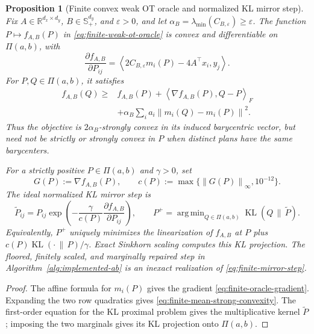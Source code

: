 \documentclass[11pt]{article}
\newcommand{\R}{\mathbb R}
\newcommand{\ip}[2]{\left\langle #1,#2\right\rangle}
\newcommand{\norm}[1]{\left\lVert #1\right\rVert}
\DeclareMathOperator{\KL}{KL}
\DeclareMathOperator*{\argmin}{arg\,min}
\theoremstyle{plain}
\newtheorem{proposition}[theorem]{Proposition}
\theoremstyle{definition}
\theoremstyle{remark}
\begin{document}
\begin{proposition}[Finite convex weak OT oracle and normalized KL mirror step]
\label{prop:finite-inner-mirror}
Fix \(A\in\R^{d_x\times d_y}\), \(B\in\mathbb S_+^{d_y}\), and
\(\varepsilon>0\), and let
\(\alpha_B=\lambda_{\min}(C_{B,\varepsilon})\ge\varepsilon\). The function
\(P\mapsto f_{A,B}(P)\) in \eqref{eq:finite-weak-ot-oracle} is convex and
differentiable on \(\Pi(a,b)\), with
\begin{equation}\label{eq:finite-oracle-gradient}
  \frac{\partial f_{A,B}}{\partial P_{ij}}
  =\ip{2C_{B,\varepsilon}m_i(P)-4A^\top x_i}{y_j}.
\end{equation}
For \(P,Q\in\Pi(a,b)\), it satisfies
\begin{equation}\label{eq:finite-mean-strong-convexity}
\begin{aligned}
 f_{A,B}(Q)\ge{}&f_{A,B}(P)
 +\ip{\nabla f_{A,B}(P)}{Q-P}_F\\
 &+\alpha_B\sum_i a_i\norm{m_i(Q)-m_i(P)}^2.
\end{aligned}
\end{equation}
Thus the objective is \(2\alpha_B\)-strongly convex in its induced barycentric
vector, but need not be strictly or strongly convex in \(P\) when distinct plans
have the same barycenters.

For a strictly positive \(P\in\Pi(a,b)\) and \(\gamma>0\), set
\[
 G(P):=\nabla f_{A,B}(P),
 \qquad c(P):=\max\{\norm{G(P)}_\infty,10^{-12}\}.
\]
The ideal normalized KL mirror step is
\begin{equation}\label{eq:finite-mirror-step}
  \widetilde P_{ij}=P_{ij}\exp\left(-\frac{\gamma}{c(P)}
  \frac{\partial f_{A,B}}{\partial P_{ij}}\right),
  \qquad
  P^+=\argmin_{Q\in\Pi(a,b)}\KL(Q\,\|\,\widetilde P).
\end{equation}
Equivalently, \(P^+\) uniquely minimizes the linearization of \(f_{A,B}\) at
\(P\) plus \(c(P)\KL(\cdot\,\|\,P)/\gamma\). Exact Sinkhorn scaling computes
this KL projection. The floored, finitely scaled, and marginally repaired step in
Algorithm~\ref{alg:implemented-ab} is an inexact realization of
\eqref{eq:finite-mirror-step}.
\end{proposition}

\begin{proof}
The affine formula for \(m_i(P)\) gives the gradient
\eqref{eq:finite-oracle-gradient}. Expanding the two row quadratics gives
\eqref{eq:finite-mean-strong-convexity}. The first-order equation for the KL
proximal problem gives the multiplicative kernel \(\widetilde P\); imposing the
two marginals gives its KL projection onto \(\Pi(a,b)\).
\end{proof}
\end{document}
